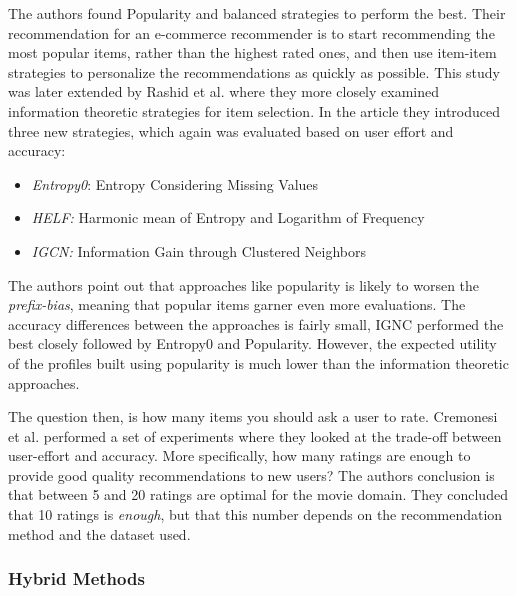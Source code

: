 The authors found Popularity and balanced strategies to perform the best. Their
recommendation for an e-commerce recommender is to start recommending the most
popular items, rather than the highest rated ones, and then use item-item
strategies to personalize the recommendations as quickly as possible. This
study was later extended by Rashid et al. \cite{Rashid2008} where they more
closely examined information theoretic strategies for item selection. In the
article they introduced three new strategies, which again was evaluated based
on user effort and accuracy:

\begin{itemize}
\item \emph{Entropy0}: Entropy Considering Missing Values
\item \emph{HELF:} Harmonic mean of Entropy and Logarithm of Frequency
\item \emph{IGCN:} Information Gain through Clustered Neighbors
\end{itemize}

The authors point out that approaches like popularity is likely to worsen the
\emph{prefix-bias}, meaning that popular items garner even more evaluations.
The accuracy differences between the approaches is fairly small, IGNC performed
the best closely followed by Entropy0 and Popularity. However, the expected
utility of the profiles built using popularity is much lower than the
information theoretic approaches.\linebreak[4]

The question then, is how many items you should ask a user to rate. Cremonesi
et al. \cite{Cremonesi2012} performed a set of experiments where they looked
at the trade-off between user-effort and accuracy. More specifically, how many
ratings are enough to provide good quality recommendations to new users? The
authors conclusion is that between 5 and 20 ratings are optimal for the movie
domain. They concluded that 10 ratings is \emph{enough}, but that this number
depends on the recommendation method and the dataset used.

\subsubsection{Hybrid Methods}


